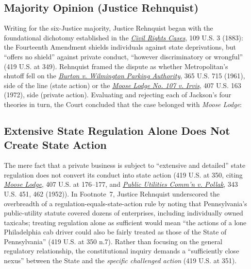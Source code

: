 \documentclass[12pt]{article}
\begin{document}
\subsection{Majority Opinion (Justice Rehnquist)}

Writing for the six-Justice majority, Justice Rehnquist began with the foundational dichotomy established in the \href{https://supreme.justia.com/cases/federal/us/109/3/}{\emph{Civil Rights Cases}}, 109 U.S. 3 (1883): the Fourteenth Amendment shields individuals against state deprivations, but ``offers no shield'' against private conduct, ``however discriminatory or wrongful'' (419 U.S. at 349). Rehnquist framed the dispute as whether Metropolitan's shutoff fell on the \href{https://supreme.justia.com/cases/federal/us/365/715/}{\emph{Burton v. Wilmington Parking Authority}}, 365 U.S. 715 (1961), side of the line (state action) or the \href{https://supreme.justia.com/cases/federal/us/407/163/}{\emph{Moose Lodge No. 107 v. Irvis}}, 407 U.S. 163 (1972), side (private action). Evaluating and rejecting each of Jackson's four theories in turn, the Court concluded that the case belonged with \emph{Moose Lodge}:

\subsection{Extensive State Regulation Alone Does Not Create State Action}
The mere fact that a private business is subject to ``extensive and detailed'' state regulation does not convert its conduct into state action (419 U.S. at 350, citing \href{https://supreme.justia.com/cases/federal/us/407/163/}{\emph{Moose Lodge}}, 407 U.S. at 176--177, and \href{https://supreme.justia.com/cases/federal/us/343/451/}{\emph{Public Utilities Comm'n v. Pollak}}, 343 U.S. 451, 462 (1952)). In Footnote~7, Justice Rehnquist underscored the overbreadth of a regulation-equals-state-action rule by noting that Pennsylvania's public-utility statute covered dozens of enterprises, including individually owned taxicabs; treating regulation alone as sufficient would mean ``the actions of a lone Philadelphia cab driver could also be fairly treated as those of the State of Pennsylvania'' (419 U.S. at 350 n.7). Rather than focusing on the general regulatory relationship, the constitutional inquiry demands a ``sufficiently close nexus'' between the State and the \emph{specific challenged action} (419 U.S. at 351).
\end{document}
